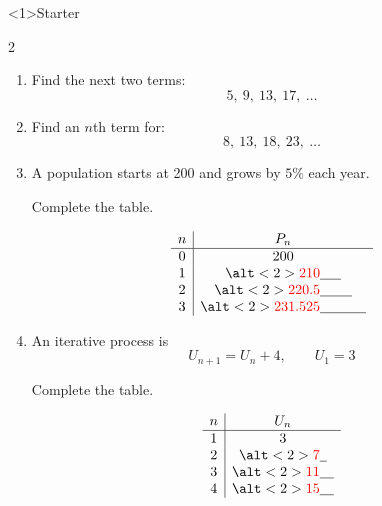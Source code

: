 \documentclass{beamer}
\newcommand{\ablank}[1]{%
  \alt<2>{\textcolor{red}{#1}}{\underline{\phantom{#1}}}%
}
\newcommand{\ashow}[1]{\uncover<2->{\textcolor{red}{\small #1}}}
\begin{document}
\begin{frame}<1>{Starter}

\small

\begin{multicols}{2}

\begin{enumerate}

\item Find the next two terms:
\[
5,\ 9,\ 13,\ 17,\ \dots
\]

\ashow{$21,\ 25$}

\vspace{0.4cm}

\item Find an $n$th term for:
\[
8,\ 13,\ 18,\ 23,\ \dots
\]

\ashow{$5n+3$}

\vspace{0.4cm}

\item A population starts at 200 and grows by $5\%$ each year.

Complete the table.

\[
\begin{array}{c|c}
n & P_n \\
\hline
0 & 200 \\
1 & \ablank{210} \\
2 & \ablank{220.5} \\
3 & \ablank{231.525}
\end{array}
\]

\vspace{0.2cm}


\vspace{0.4cm}

\item An iterative process is
\[
U_{n+1} = U_n + 4, \qquad U_1 = 3
\]

Complete the table.

\[
\begin{array}{c|c}
n & U_n \\
\hline
1 & 3 \\
2 & \ablank{7} \\
3 & \ablank{11} \\
4 & \ablank{15}
\end{array}
\]

\end{enumerate}

\end{multicols}

\end{frame}
\end{document}
